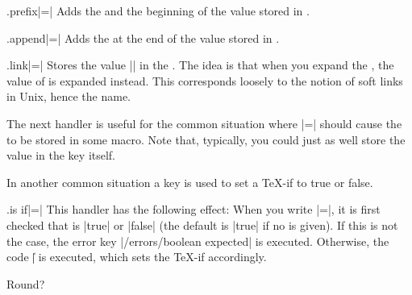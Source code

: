 \begin{handler}{{.prefix}|=|}
  Adds the  and the beginning of the value stored in .
\end{handler}

\begin{handler}{{.append}|=|}
  Adds the  at the end of the value stored in .
\end{handler}

\begin{handler}{{.link}|=|}
  Stores the value || in the
  . The idea is that when you expand the , the
  value of  is expanded instead. This corresponds
  loosely to the notion of soft links in Unix, hence the name.
\end{handler}

The next handler is useful for the common situation where
|=| should cause the  to be stored
in some macro. Note that, typically, you could just as well store the
value in the key itself.



In another common situation a key is used to set a \TeX-if to true or
false. 

\begin{handler}{{.is if}|=|}
  This handler has the following effect: When you write
  |=|, it is first checked that  is
  |true| or |false| (the default is |true| if no  is
  given). If this is not the case, the error key
  |/errors/boolean expected| is executed. Otherwise, 
  the code |\| is executed, which sets
  the \TeX-if accordingly.
\begin{codeexample}[]
\newif\iftheworldisflat    
{}
\iftheworldisflat
  Flat
\else
  Round?
\fi
\end{codeexample}
\end{handler}

